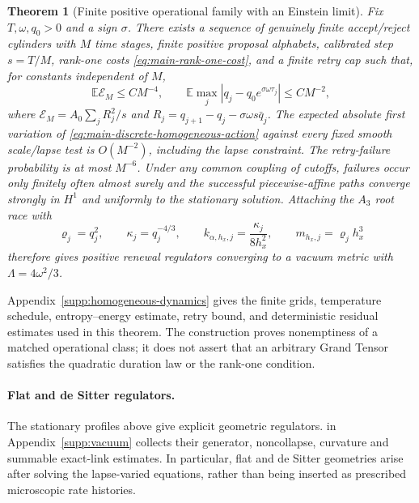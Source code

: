\documentclass[11pt]{article}
\newtheorem{theorem}{Theorem}[section]
\numberwithin{equation}{section}
\theoremstyle{definition}
\theoremstyle{remark}
\begin{document}
\begin{theorem}[Finite positive operational family with an Einstein limit]
\label{thm:main-explicit-operational-family}
Fix $T,\omega,q_0>0$ and a sign $\sigma$.  There exists a sequence of genuinely
finite accept/reject cylinders with $M$ time stages, finite positive proposal
alphabets, calibrated step $s=T/M$, rank-one costs
\eqref{eq:main-rank-one-cost}, and a finite retry cap such that, for constants
independent of $M$,
\begin{equation}
 \mathbb E\mathcal E_M\le CM^{-4},\qquad
 \mathbb E\max_j|q_j-q_0e^{\sigma\omega\tau_j}|\le CM^{-2},
 \label{eq:main-stochastic-profile}
\end{equation}
where
$\mathcal E_M=A_0\sum_jR_j^2/s$ and
$R_j=q_{j+1}-q_j-\sigma\omega s\bar q_j$.  The expected absolute first
variation of \eqref{eq:main-discrete-homogeneous-action} against every fixed
smooth scale/lapse test is $O(M^{-2})$, including the lapse constraint.  The
retry-failure probability is at most $M^{-6}$.  Under any common coupling of
cutoffs, failures occur only finitely often almost surely and the successful
piecewise-affine paths converge strongly in $H^1$ and uniformly to the
stationary solution.  Attaching the $A_3$ root race with
\begin{equation}
 \varrho_j=q_j^2,\qquad \kappa_j=q_j^{-4/3},\qquad
 k_{\alpha,h_x,j}=\frac{\kappa_j}{8h_x^2},\qquad
 m_{h_x,j}=\varrho_jh_x^3
 \label{eq:main-stochastic-root-rates}
\end{equation}
therefore gives positive renewal regulators converging to a vacuum metric with
$\Lambda=4\omega^2/3$.
\end{theorem}

Appendix~\ref{supp:homogeneous-dynamics} gives the finite grids, temperature
schedule, entropy--energy estimate, retry bound, and deterministic residual
estimates used in this theorem.  The construction proves nonemptiness of a
matched operational class; it does not assert that an arbitrary Grand Tensor
satisfies the quadratic duration law or the rank-one condition.

\paragraph{Flat and de Sitter regulators.}
The stationary profiles above give explicit geometric regulators.
 in Appendix~\ref{supp:vacuum} collects their generator,
noncollapse, curvature and summable exact-link estimates. In particular,
flat and de Sitter geometries arise after solving the lapse-varied equations,
rather than being inserted as prescribed microscopic rate histories.
\end{document}
